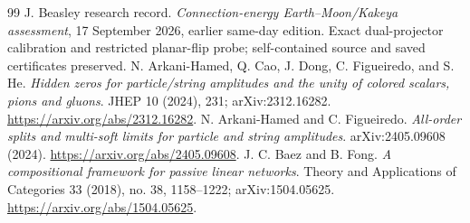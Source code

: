 \documentclass[11pt,letterpaper]{article}
\theoremstyle{definition}
\theoremstyle{remark}\newtheorem{remark}[theorem]{Remark}
\begin{document}
\begin{thebibliography}{99}
 J. Beasley research record. \emph{Connection-energy Earth--Moon/Kakeya assessment}, 17 September 2026, earlier same-day edition. Exact dual-projector calibration and restricted planar-flip probe; self-contained source and saved certificates preserved.
 N. Arkani-Hamed, Q. Cao, J. Dong, C. Figueiredo, and S. He. \emph{Hidden zeros for particle/string amplitudes and the unity of colored scalars, pions and gluons}. JHEP 10 (2024), 231; arXiv:2312.16282. \url{https://arxiv.org/abs/2312.16282}.
 N. Arkani-Hamed and C. Figueiredo. \emph{All-order splits and multi-soft limits for particle and string amplitudes}. arXiv:2405.09608 (2024). \url{https://arxiv.org/abs/2405.09608}.
 J. C. Baez and B. Fong. \emph{A compositional framework for passive linear networks}. Theory and Applications of Categories 33 (2018), no. 38, 1158--1222; arXiv:1504.05625. \url{https://arxiv.org/abs/1504.05625}.
\end{thebibliography}
\end{document}
